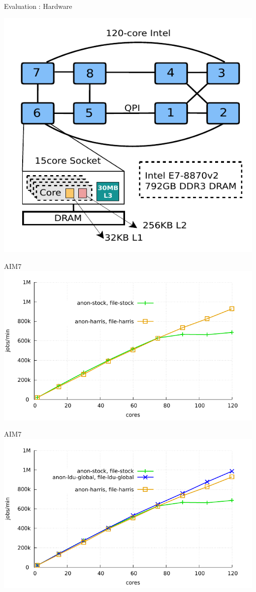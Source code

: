 \documentclass[english]{beamer} %
\begin{document}
\begin{frame}{Evaluation : Hardware}
\begin{center}
\includegraphics[scale=0.8]{fig/xeon}
\end{center}
\end{frame}


\begin{frame}{AIM7}
\includegraphics[scale=0.8]{graph/aim7}
\end{frame}

\begin{frame}{AIM7}
\includegraphics[scale=0.8]{graph/aim7_1}
\end{frame}
\end{document}
